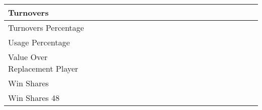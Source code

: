 \documentclass{article}
\def \cm{\checkmark}
\begin{document}
\begin{table}[ht]
\begin{tabular}{lccccccccccccccccccccc}
            \midrule
            Turnovers                           &     &     &     &     &     &     &     &     &     &     &     &     &     &     & \cm & \cm & \cm & \cm & \cm & \cm & \cm \\
            \midrule
            Turnovers Percentage                &     &     &     &     &     &     &     &     &     &     &     &     &     &     &     &     & \cm & \cm & \cm & \cm & \cm \\
            \midrule
            Usage Percentage                    &     &     &     &     &     &     &     &     &     &     &     &     &     &     &     & \cm & \cm & \cm & \cm & \cm & \cm \\
            \midrule
            Value Over Replacement Player       &     &     &     &     &     &     &     &     &     &     &     &     & \cm & \cm & \cm & \cm & \cm & \cm & \cm & \cm & \cm \\
            \midrule
            Win Shares                          &     &     & \cm & \cm & \cm & \cm & \cm & \cm & \cm & \cm & \cm & \cm & \cm & \cm & \cm & \cm & \cm & \cm & \cm & \cm & \cm \\
            \midrule
            Win Shares 48                       &     &     &     &     &     &     &     &     & \cm & \cm & \cm & \cm & \cm & \cm & \cm & \cm & \cm & \cm & \cm & \cm & \cm \\
            \bottomrule
        \end{tabular}
    \end{table}
\end{document}
